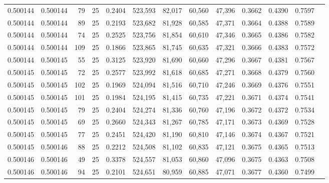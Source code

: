 \begin{tabular}{rrrrrrrrrrrrr}
0.500144 & 0.500144 &    79 &  25 &                                     0.2404 & 523,593 &  82,017 &  60,560 &  47,396 & 0.3662 & 0.4390 & 0.7597 \\
0.500144 & 0.500144 &    89 &  25 &                                     0.2193 & 523,682 &  81,928 &  60,585 &  47,371 & 0.3664 & 0.4388 & 0.7589 \\
0.500144 & 0.500144 &    74 &  25 &                                     0.2525 & 523,756 &  81,854 &  60,610 &  47,346 & 0.3665 & 0.4386 & 0.7582 \\
0.500144 & 0.500144 &   109 &  25 &                                     0.1866 & 523,865 &  81,745 &  60,635 &  47,321 & 0.3666 & 0.4383 & 0.7572 \\
0.500144 & 0.500145 &    55 &  25 &                                     0.3125 & 523,920 &  81,690 &  60,660 &  47,296 & 0.3667 & 0.4381 & 0.7567 \\
0.500145 & 0.500145 &    72 &  25 &                                     0.2577 & 523,992 &  81,618 &  60,685 &  47,271 & 0.3668 & 0.4379 & 0.7560 \\
0.500145 & 0.500145 &   102 &  25 &                                     0.1969 & 524,094 &  81,516 &  60,710 &  47,246 & 0.3669 & 0.4376 & 0.7551 \\
0.500145 & 0.500145 &   101 &  25 &                                     0.1984 & 524,195 &  81,415 &  60,735 &  47,221 & 0.3671 & 0.4374 & 0.7541 \\
0.500145 & 0.500145 &    79 &  25 &                                     0.2404 & 524,274 &  81,336 &  60,760 &  47,196 & 0.3672 & 0.4372 & 0.7534 \\
0.500145 & 0.500145 &    69 &  25 &                                     0.2660 & 524,343 &  81,267 &  60,785 &  47,171 & 0.3673 & 0.4369 & 0.7528 \\
0.500145 & 0.500145 &    77 &  25 &                                     0.2451 & 524,420 &  81,190 &  60,810 &  47,146 & 0.3674 & 0.4367 & 0.7521 \\
0.500145 & 0.500146 &    88 &  25 &                                     0.2212 & 524,508 &  81,102 &  60,835 &  47,121 & 0.3675 & 0.4365 & 0.7513 \\
0.500146 & 0.500146 &    49 &  25 &                                     0.3378 & 524,557 &  81,053 &  60,860 &  47,096 & 0.3675 & 0.4363 & 0.7508 \\
0.500146 & 0.500146 &    94 &  25 &                                     0.2101 & 524,651 &  80,959 &  60,885 &  47,071 & 0.3677 & 0.4360 & 0.7499 \\

\end{tabular}

